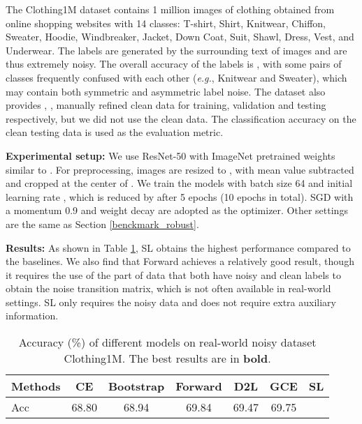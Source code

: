 \documentclass[10pt,twocolumn,letterpaper]{article}
\begin{document}
The Clothing1M dataset contains 1 million images of clothing obtained from online shopping websites with 14 classes: T-shirt, Shirt, Knitwear, Chiffon, Sweater, Hoodie, Windbreaker, Jacket, Down Coat, Suit, Shawl, Dress, Vest, and Underwear. The labels are generated by the surrounding text of images and are thus extremely noisy. The overall accuracy of the labels is , with some pairs of classes frequently confused with each other (\textit{e.g.}, Knitwear and Sweater), which may contain both symmetric and asymmetric label noise. The dataset also provides , ,  manually refined clean data for training, validation and testing respectively, but we did not use the  clean data. The classification accuracy on the  clean testing data is used as the evaluation metric. 

\noindent\textbf{Experimental setup:} 
We use ResNet-50 with ImageNet pretrained weights  similar to \cite{patrini2017making,xiao2015learning}. For preprocessing, images are resized to , with mean value subtracted and cropped at the center of . We train the models with batch size 64 and initial learning rate , which is reduced by  after 5 epochs (10 epochs in total). SGD with a momentum 0.9 and weight decay  are adopted as the optimizer. Other settings are the same as Section \ref{benckmark_robust}. 

\noindent\textbf{Results:} 
As shown in Table \ref{tab:clothing}, SL obtains the highest performance compared to the baselines.  We also find that Forward achieves a relatively good result, though it requires the use of the part of data that both have noisy and clean labels to obtain the noise transition matrix, which is not often available in real-world settings. SL only requires the noisy data and does not require extra auxiliary information.

\begin{table}[!t]
\centering
\small
\caption{Accuracy (\%) of different models on real-world noisy dataset Clothing1M. The best results are in \textbf{bold}.}
\vspace{-0.1 in}
\label{tab:clothing}
\begin{adjustbox}{width=0.49\textwidth}
\begin{tabular}{l|cccccc}
\hline
Methods & CE & Bootstrap & Forward & D2L & GCE & \textbf{SL}\\ \hline
Acc & 68.80 & 68.94 & 69.84 & 69.47 & 69.75 & \\
\hline
\end{tabular}
\end{adjustbox}
\vspace{-0.15 in}
\end{table}
\end{document}
